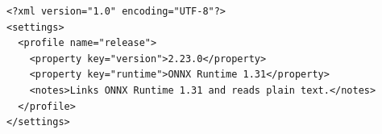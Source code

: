 \documentclass[11pt,a4paper]{article}
\begin{document}
\begin{verbatim}
<?xml version="1.0" encoding="UTF-8"?>
<settings>
  <profile name="release">
    <property key="version">2.23.0</property>
    <property key="runtime">ONNX Runtime 1.31</property>
    <notes>Links ONNX Runtime 1.31 and reads plain text.</notes>
  </profile>
</settings>
\end{verbatim}
\end{document}
